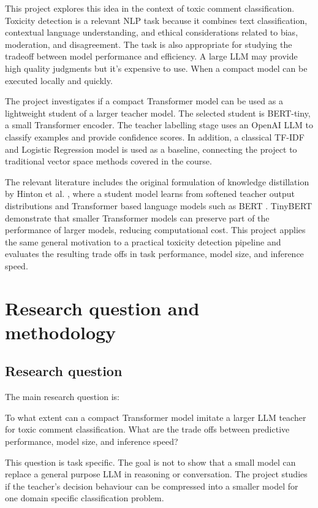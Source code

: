 \documentclass[pdflatex,sn-mathphys-num]{sn-jnl}
\begin{document}
This project explores this idea in the context of toxic comment classification. Toxicity detection is a relevant NLP task because it combines text classification, contextual language understanding, and ethical considerations related to bias, moderation, and disagreement.
The task is also appropriate for studying the tradeoff between model performance and efficiency. A large LLM may provide high quality judgments but it's expensive to use.
When a compact model can be executed locally and quickly.

The project investigates if a compact Transformer model can be used as a lightweight student of a larger teacher model.
The selected student is BERT-tiny, a small Transformer encoder.
The teacher labelling stage uses an OpenAI LLM to classify examples and provide confidence scores.
In addition, a classical TF-IDF and Logistic Regression model is used as a baseline, connecting the project to traditional vector space methods covered in the course.

The relevant literature includes the original formulation of knowledge distillation by Hinton et al. \cite{hinton2015distilling}, where a student model learns from softened teacher output distributions and Transformer based language models such as BERT \cite{devlin2019bert}.
TinyBERT \cite{jiao2020tinybert} demonstrate that smaller Transformer models can preserve part of the performance of larger models, reducing computational cost. 
This project applies the same general motivation to a practical toxicity detection pipeline and evaluates the resulting trade offs in task performance, model size, and inference speed.

\section{Research question and methodology}\label{sec:methodology}

\subsection{Research question}

The main research question is:


To what extent can a compact Transformer model imitate a larger LLM teacher for toxic comment classification.
What are the trade offs between predictive performance, model size, and inference speed?


This question is task specific. 
The goal is not to show that a small model can replace a general purpose LLM in reasoning or conversation. 
The project studies if the teacher's decision behaviour can be compressed into a smaller model for one domain specific classification problem.
\end{document}
